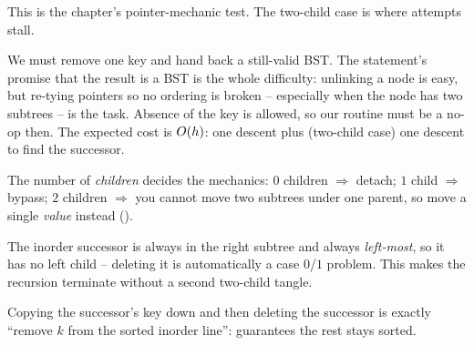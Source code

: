 \begin{attemptgate}
This is the chapter's pointer-mechanic test. The two-child case is where attempts stall.
\end{attemptgate}

We must remove one key and hand back a still-valid BST. The statement's promise that the result is a
BST is the whole difficulty: unlinking a node is easy, but re-tying pointers so no ordering is broken
-- especially when the node has two subtrees -- is the task. Absence of the key is allowed, so our
routine must be a no-op then. The expected cost is $O(h)$: one descent plus (two-child case) one
descent to find the successor.

\begin{observation}
The number of \emph{children} decides the mechanics: $0$ children $\Rightarrow$ detach; $1$ child
$\Rightarrow$ bypass; $2$ children $\Rightarrow$ you cannot move two subtrees under one parent, so move
a single \emph{value} instead ().
\end{observation}
\begin{observation}
The inorder successor is always in the right subtree and always \emph{left-most}, so it has no left
child -- deleting it is automatically a case $0$/$1$ problem. This makes the recursion terminate
without a second two-child tangle.
\end{observation}
\begin{observation}
Copying the successor's key down and then deleting the successor is exactly ``remove $k$ from the
sorted inorder line'':  guarantees the rest stays sorted.
\end{observation}

